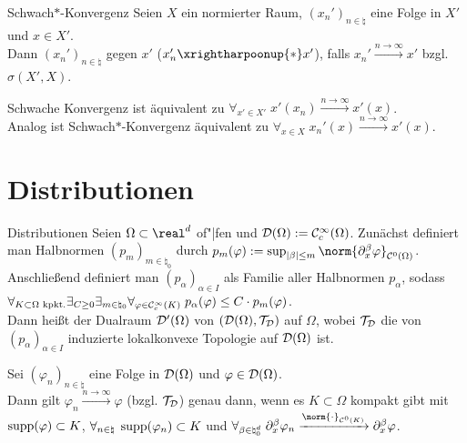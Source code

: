 \begin{Def}{Schwach$\ast$-Konvergenz}
    Seien $X$ ein normierter Raum, $(x_n')_{n \in \natural}$ eine Folge in $X'$ und $x \in X'$.\\
    Dann  $(x_n')_{n \in \natural}$  gegen $x'$
    ($x_n' \xrightharpoonup{\ast} x'$), falls
    $x_n' \xrightarrow{n \to \infty} x'$ bzgl. $\sigma(X', X)$.
\end{Def}

\begin{Bem}
    Schwache Konvergenz ist äquivalent
    zu $\forall_{x' \in X'}\; x'(x_n) \xrightarrow{n \to \infty} x'(x)$.\\
    Analog ist Schwach$\ast$-Konvergenz äquivalent
    zu $\forall_{x \in X}\; x_n'(x) \xrightarrow{n \to \infty} x'(x)$.
\end{Bem}

\section{%
    Distributionen%
}

\begin{Def}{Distributionen}
    Seien $\Omega \subset \real^d$ of"|fen und $\mathcal{D}(\Omega) := \mathcal{C}^\infty_c(\Omega)$.
    Zunächst definiert man Halbnormen $(p_m)_{m \in \natural_0}$
    durch $p_m(\varphi) := \sup_{|\beta| \le m} \norm{\partial_x^\beta \varphi}_{\C^0(\Omega)}$.
    Anschließend definiert man $(p_\alpha)_{\alpha \in I}$ als Familie aller Halbnormen
    $p_\alpha$, sodass
    $\forall_{K \subset \Omega \text{ kpkt.}} \exists_{C \ge 0} \exists_{m \in \natural_0}
    \forall_{\varphi \in \mathcal{C}^\infty_c(K)}\; p_\alpha(\varphi) \le C \cdot p_m(\varphi)$.\\
    Dann heißt der Dualraum $\mathcal{D}'(\Omega)$ von $(\mathcal{D}(\Omega), \mathcal{T}_{\mathcal{D}})$
     auf $\Omega$,
    wobei $\mathcal{T}_{\mathcal{D}}$ die von $(p_\alpha)_{\alpha \in I}$ induzierte lokalkonvexe Topologie auf
    $\mathcal{D}(\Omega)$ ist.
\end{Def}

\begin{Bem}
    Sei $(\varphi_n)_{n \in \natural}$ eine Folge in $\mathcal{D}(\Omega)$ und $\varphi \in \mathcal{D}(\Omega)$.\\
    Dann gilt $\varphi_n \xrightarrow{n \to \infty} \varphi$ (bzgl. $\mathcal{T}_{\mathcal{D}}$) genau dann, wenn
    es $K \subset \Omega$ kompakt gibt mit\\
    $\operatorname{supp}(\varphi) \subset K$,
    $\forall_{n \in \natural}\; \operatorname{supp}(\varphi_n) \subset K$ und
    $\forall_{\beta \in \natural_0^d}\; \partial_x^\beta \varphi_n
    \xrightarrow{\norm{\cdot}_{\C^0(K)}} \partial_x^\beta \varphi$.
\end{Bem}

